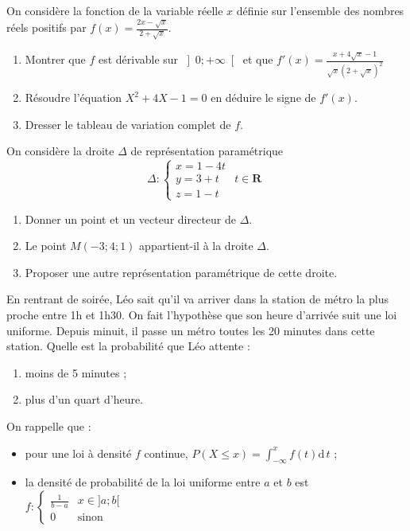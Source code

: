 \begin{question}[topic=fonction]
  On considère la fonction de la variable réelle $x$ définie sur
  l'ensemble des nombres réels positifs par $f(x) = \frac{2x - \sqrt{x}}{2
  + \sqrt{x}}$.

  \begin{enumerate}
    \item Montrer que $f$ est dérivable sur $\left]0 ; +\infty\right[$ et
      que $f'(x) = \frac{ x + 4\sqrt{x} - 1}{\sqrt{x}(2 + \sqrt{x})^2}$
    \item Résoudre l'équation $X^2 + 4X - 1 =0$ en déduire le signe de
      $f'(x)$.
    \item Dresser le tableau de variation complet de $f$.
  \end{enumerate}
\end{question}

\begin{question}[topic=géométrie]
  On considère la droite $\Delta$ de représentation paramétrique \[ \Delta
    : \left\lbrace \begin{array}{lr} x = 1 - 4t & \\ y = 3 + t & t\in
  \mathbf{R} \\ z = 1 - t & \end{array}\right. \]

  \begin{enumerate}
    \item Donner un point et un vecteur directeur de $\Delta$.
    \item Le point $M (-3;4;1)$ appartient-il à la droite $\Delta$.
    \item Proposer une autre représentation paramétrique de cette droite.
  \end{enumerate}
\end{question}

\begin{question}[topic=loi_continue]
  En rentrant de soirée, Léo sait qu'il va arriver dans la station de
  métro la plus proche entre 1h et 1h30. On fait l'hypothèse que son heure
  d'arrivée suit une loi uniforme. Depuis minuit, il passe un métro toutes
  les 20 minutes dans cette station. Quelle est la probabilité que Léo
  attente :
  \begin{enumerate}
    \item moins de 5 minutes ;
    \item plus d'un quart d'heure.
  \end{enumerate}

  On rappelle que :
  \begin{itemize}
    \item pour une loi à densité $f$ continue, $P(X \leq x) =
      \int_{-\infty}^x f(t) \mathrm{d}\,t$ ;
    \item la densité de probabilité de la loi uniforme entre $a$ et $b$
      est $f : \left\lbrace \begin{array}{lr} \frac1{b-a} & x \in ]a;b[
    \\ 0 & \text{sinon}\end{array}\right.$
  \end{itemize}
\end{question}

